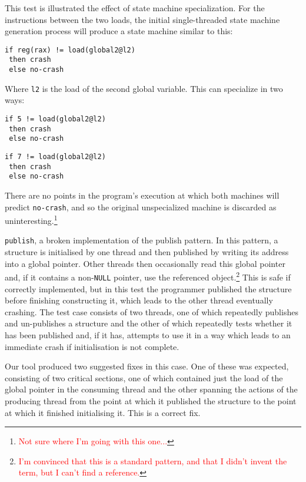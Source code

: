 \documentclass[10pt,twocolumn,preprint,natbib,authoryear]{sigplanconf}
\newcommand{\editorial}[1]{\textcolor{red}{\footnote{\textcolor{red}{#1}}}}
\begin{document}
This test is illustrated the effect of state machine specialization.
For the instructions between the two loads, the initial
single-threaded state machine generation process will produce a state
machine similar to this:

\begin{verbatim}
if reg(rax) != load(global2@l2)
 then crash
 else no-crash
\end{verbatim}

Where \verb|l2| is the load of the second global variable.  This
can specialize in two ways:

\begin{verbatim}
if 5 != load(global2@l2)
 then crash
 else no-crash
\end{verbatim}

\begin{verbatim}
if 7 != load(global2@l2)
 then crash
 else no-crash
\end{verbatim}

There are no points in the program's execution at which both machines
will predict \verb|no-crash|, and so the original unspecialized
machine is discarded as uninteresting.\editorial{Not sure where I'm
  going with this one...}

\verb|publish|, a broken implementation of the publish pattern.  In
this pattern, a structure is initialised by one thread and then
published by writing its address into a global pointer.  Other threads
then occasionally read this global pointer and, if it contains a
non-\verb|NULL| pointer, use the referenced object.\editorial{I'm
  convinced that this is a standard pattern, and that I didn't invent
  the term, but I can't find a reference.}  This is safe if correctly
implemented, but in this test the programmer published the structure
before finishing constructing it, which leads to the other thread
eventually crashing.  The test case consists of two threads, one of
which repeatedly publishes and un-publishes a structure and the other
of which repeatedly tests whether it has been published and, if it
has, attempts to use it in a way which leads to an immediate crash if
initialisation is not complete.

Our tool produced two suggested fixes in this case.  One of these was
expected, consisting of two critical sections, one of which contained
just the load of the global pointer in the consuming thread and the
other spanning the actions of the producing thread from the point at
which it published the structure to the point at which it finished
initialising it.  This is a correct fix.
\end{document}
